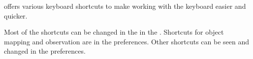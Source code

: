 

\app{} offers various keyboard shortcuts to make working with the keyboard easier and quicker. 

Most of the shortcuts can be changed in the  in the \ite{}. Shortcuts for object mapping and observation are in the \app{} preferences. Other shortcuts can be seen and changed in the  preferences.

